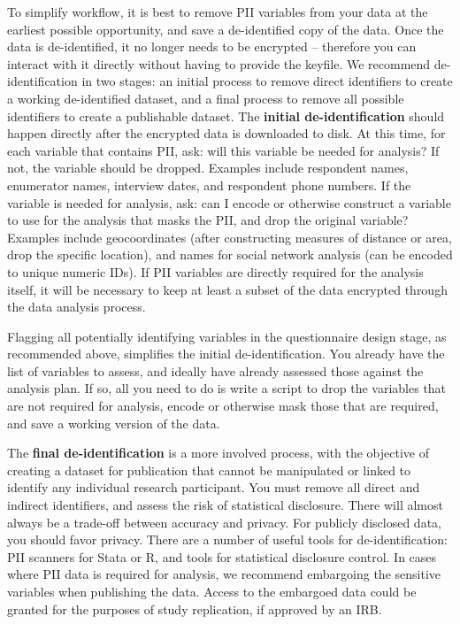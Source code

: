 To simplify workflow, it is best to remove PII variables from your data
at the earliest possible opportunity, and save a de-identified copy of the data.
Once the data is de-identified, it no longer needs to be encrypted
-- therefore you can interact with it directly without having to provide the keyfile.
We recommend de-identification in two stages:
an initial process to remove direct identifiers to create a working de-identified dataset,
and a final process to remove all possible identifiers to create a publishable dataset.
The \textbf{initial de-identification} should happen directly after the encrypted data is downloaded to disk.
At this time, for each variable that contains PII, ask: will this variable be needed for analysis?
If not, the variable should be dropped.
Examples include respondent names, enumerator names, interview dates, and respondent phone numbers.
If the variable is needed for analysis, ask:
can I encode or otherwise construct a variable to use for the analysis that masks the PII,
and drop the original variable?
Examples include geocoordinates (after constructing measures of distance or area, drop the specific location), and names for social network analysis (can be encoded to unique numeric IDs).
If PII variables are directly required for the analysis itself,
it will be necessary to keep at least a subset of the data encrypted through the data analysis process.

Flagging all potentially identifying variables in the questionnaire design stage,
as recommended above, simplifies the initial de-identification.
You already have the list of variables to assess,
and ideally have already assessed those against the analysis plan.
If so, all you need to do is write a script to drop the variables that are not required for analysis,
 encode or otherwise mask those that are required, and save a working version of the data.

The \textbf{final de-identification} is a more involved process,
with the objective of creating a dataset for publication
that cannot be manipulated or linked to identify any individual research participant.
You must remove all direct and indirect identifiers, and assess the risk of statistical disclosure.
There will almost always be a trade-off between accuracy and privacy.
For publicly disclosed data, you should favor privacy.
There are a number of useful tools for de-identification: PII scanners for Stata
or R,
and tools for statistical disclosure control.
In cases where PII data is required for analysis,
we recommend embargoing the sensitive variables when publishing the data.
Access to the embargoed data could be granted for the purposes of study replication, if approved by an IRB.

